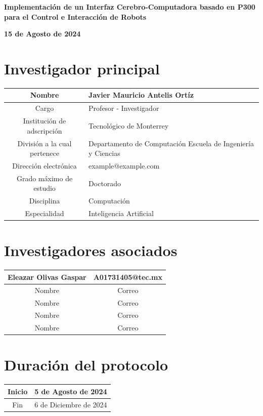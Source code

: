 \documentclass[12pt]{article}
\begin{document}
\begin{flushleft}
    \textbf{\Large Implementación de un Interfaz Cerebro-Computadora basado en P300 para el Control e Interacción de Robots}
    \par
    \textbf{15 de Agosto de 2024}
\end{flushleft}

\section{Investigador principal}

\begin{table}[h!]
    \centering
    \begin{tabular}{|c|p{10cm}|} \hline
        Nombre & Javier Mauricio Antelis Ortíz \\ \hline
        Cargo & Profesor - Investigador \\ \hline
        Institución de adscripción & Tecnológico de Monterrey \\ \hline
        División a la cual pertenece & Departamento de Computación \newline Escuela de Ingeniería y Ciencias \\ \hline
        Dirección electrónica & example@example.com \\ \hline
        Grado máximo de estudio & Doctorado \\ \hline
        Disciplina & Computación \\ \hline
        Especialidad & Inteligencia Artificial \\ \hline
    \end{tabular}
\end{table}

\section{Investigadores asociados}

\begin{table}[h!]
    \centering
    \begin{tabular}{|c|c|} \hline
        Eleazar Olivas Gaspar & A01731405@tec.mx \\ \hline
        Nombre & Correo \\ \hline
        Nombre & Correo \\ \hline
        Nombre & Correo \\ \hline
        Nombre & Correo \\ \hline
    \end{tabular}
\end{table}

\section{Duración del protocolo}

\begin{table}[h!]
    \centering
    \begin{tabular}{|c|c|} \hline
        Inicio & 5 de Agosto de 2024 \\ \hline
        Fin & 6 de Diciembre de 2024 \\ \hline
    \end{tabular}
\end{table}
\end{document}
